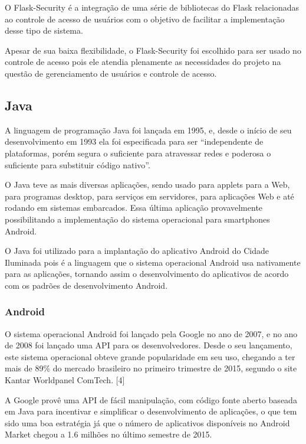 \documentclass[
	article,			%
	11pt,				%
	oneside,			%
	a4paper,			%
	english,			%
	brazil,				%
	sumario=tradicional
	]{abntex2}
\begin{document}
O Flask-Security é a integração de uma série de bibliotecas do Flask
relacionadas ao controle de acesso de usuários com o objetivo de facilitar a
implementação desse tipo de sistema. \cite{flasksecurity}

Apesar de sua baixa flexibilidade, o Flask-Security foi escolhido para ser
usado no controle de acesso pois ele atendia plenamente as necessidades do
projeto na questão de gerenciamento de usuários e controle de acesso.


\subsection{Java}

A linguagem de programação Java foi lançada em 1995, e, desde o início de seu
desenvolvimento em 1993 ela foi especificada para ser “independente de plataformas,
porém segura o suficiente para atravessar redes e poderosa o suficiente para
substituir código nativo”. \cite{java}

O Java teve as mais diversas aplicações, sendo usado para applets para a Web,
para programas desktop, para serviços em servidores, para aplicações Web e até
rodando em sistemas embarcados. Essa última aplicação provavelmente
possibilitando a implementação do sistema operacional para smartphones Android.

O Java foi utilizado para a implantação do aplicativo Android do Cidade
Iluminada pois é a linguagem que o sistema operacional Android usa
nativamente para as aplicações, tornando assim o desenvolvimento do aplicativos
de acordo com os padrões de desenvolvimento Android.


\subsubsection{Android}

O sistema operacional Android foi lançado pela Google no ano de 2007, e no ano
de 2008 foi lançado uma API para os desenvolvedores. Desde o seu lançamento,
este sistema operacional obteve grande popularidade em seu uso, chegando a ter
mais de 89\% do mercado brasileiro no primeiro trimestre de 2015, segundo o site
Kantar Worldpanel ComTech. [4]

A Google provê uma API de fácil manipulação, com código fonte aberto baseada em
Java para incentivar e simplificar o desenvolvimento de aplicações, o que tem
sido uma boa estratégia já que o número de aplicativos disponíveis no Android
Market chegou a 1.6 milhões no último semestre de 2015.
\end{document}
